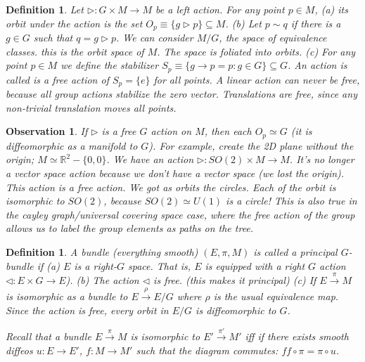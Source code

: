 \documentclass[11pt]{book}
\newtheorem{definition}[theorem]{Definition}
\newtheorem{observation}[theorem]{Observation}
\begin{document}
\begin{definition}
Let $\triangleright: G \times M \rightarrow M$ be a left action. For any point $p \in M$, (a) its orbit under the action
is the set $O_p \equiv \{ g \triangleright p \} \subseteq M$. (b) Let $p \sim q$ if there is a $g \in G$ such that $q = g \triangleright p$.
We can consider $M / G$, the space of equivalence classes. this is the orbit space of $M$. The space is foliated into orbits.
(c)  For any point $p \in M$ we define the stabilizer $S_p \equiv \{ g \rightarrow p = p : g \in G \} \subseteq G$.
An action is called is a \emph{free action} of $S_p = \{ e \}$ for all points. A linear action can never be free,
because all group actions stabilize the zero vector. Translations are free, since any non-trivial translation
moves all points.
\end{definition}

\begin{observation}
If $\triangleright$ is a free $G$ action on $M$, then each $O_p \simeq G$ (it is diffeomorphic as a manifold to $G$).
For example, create the 2D plane without the origin;
$M \simeq \mathbb R^2 - \{ 0, 0 \}$.
We have an action $\triangleright : SO(2) \times M \rightarrow M$.
It's no longer a vector space action because we don't have a vector space
(we lost the origin). This action is a free action. We got as orbits the circles. Each of the
orbit is isomorphic to $SO(2)$, because $SO(2) \simeq U(1)$ is a circle!
This is also true in the cayley graph/universal covering space case,
where the free action of the group allows us to label the group elements as paths on the tree.
\end{observation}


\begin{definition}
A bundle (everything smooth) $(E, \pi, M)$ is called a principal $G$-bundle if
(a) $E$ is a right-$G$ space. That is, $E$ is equipped with a right $G$ action
$\triangleleft: E \times G \rightarrow E$).
(b) The action $\triangleleft$ is free. (this makes it principal)
(c) If $E \xrightarrow{\pi} M$ is isomorphic as a bundle to $E \xrightarrow{\rho} E/G$ where $\rho$
is the usual equivalence map. Since the action is free, every orbit in $E/G$ is diffeomorphic to $G$.

Recall that a bundle $E \xrightarrow{\pi} M$ is isomorphic to $E' \xrightarrow{\pi'} M'$ iff
if there exists smooth diffeos $u: E \rightarrow E'$, $f: M \rightarrow M'$ such that the diagram
commutes: $ff \circ \pi = \pi \circ u$.
\end{definition}
\end{document}
